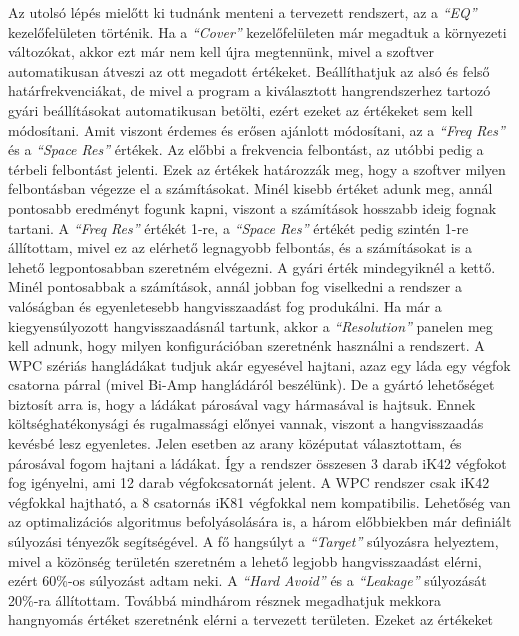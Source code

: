 Az utolsó lépés mielőtt ki tudnánk menteni a tervezett rendszert, az a \textit{``EQ''} kezelőfelületen történik.
Ha a \textit{``Cover''} kezelőfelületen már megadtuk a környezeti változókat, akkor ezt már nem kell újra megtennünk,
mivel a szoftver automatikusan átveszi az ott megadott értékeket. Beállíthatjuk az alsó és felső határfrekvenciákat, de mivel
a program a kiválasztott hangrendszerhez tartozó gyári beállításokat automatikusan betölti, ezért ezeket az értékeket sem kell módosítani.
Amit viszont érdemes és erősen ajánlott módosítani, az a \textit{``Freq Res''} és a \textit{``Space Res''} értékek. Az előbbi a
frekvencia felbontást, az utóbbi pedig a térbeli felbontást jelenti. Ezek az értékek határozzák meg, hogy a szoftver milyen 
felbontásban végezze el a számításokat. Minél kisebb értéket adunk meg, annál pontosabb eredményt fogunk kapni, viszont a számítások
hosszabb ideig fognak tartani. A \textit{``Freq Res''} értékét 1-re, a \textit{``Space Res''} értékét pedig szintén 1-re állítottam, mivel
ez az elérhető legnagyobb felbontás, és a számításokat is a lehető legpontosabban szeretném elvégezni. A gyári érték mindegyiknél a kettő.
Minél pontosabbak a számítások, annál jobban fog viselkedni a rendszer a valóságban és egyenletesebb hangvisszaadást fog produkálni.
Ha már a kiegyensúlyozott hangvisszaadásnál tartunk, akkor a \textit{``Resolution''} panelen meg kell adnunk, hogy milyen
konfigurációban szeretnénk használni a rendszert. A WPC szériás hangládákat tudjuk akár egyesével hajtani, azaz egy láda egy végfok csatorna
párral (mivel Bi-Amp hangládáról beszélünk). De a gyártó lehetőséget biztosít arra is, hogy a ládákat párosával vagy hármasával is hajtsuk.
Ennek költséghatékonysági és rugalmassági előnyei vannak, viszont a hangvisszaadás kevésbé lesz egyenletes. Jelen esetben 
az arany középutat választottam, és párosával fogom hajtani a ládákat. Így a rendszer összesen 3 darab iK42 végfokot fog igényelni, ami 
12 darab végfokcsatornát jelent. A WPC rendszer csak iK42 végfokkal hajtható, a 8 csatornás iK81 végfokkal nem kompatibilis.
Lehetőség van az optimalizációs algoritmus befolyásolására is, a három előbbiekben már definiált súlyozási tényezők segítségével.
A fő hangsúlyt a \textit{``Target''} súlyozásra helyeztem, mivel a közönség területén szeretném a lehető legjobb hangvisszaadást elérni,
ezért 60\%-os súlyozást adtam neki.
A \textit{``Hard Avoid''} és a \textit{``Leakage''} súlyozását 20\%-ra állítottam.
Továbbá mindhárom résznek megadhatjuk mekkora hangnyomás értéket szeretnénk elérni a tervezett területen. Ezeket az értékeket
